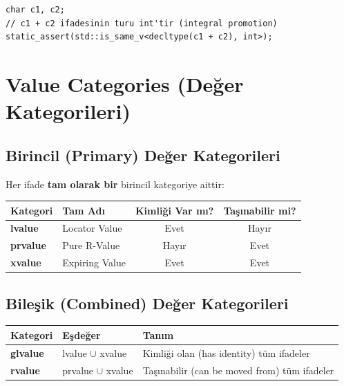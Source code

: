 \documentclass[a4paper,12pt]{article}
\begin{document}
\begin{lstlisting}
char c1, c2;
// c1 + c2 ifadesinin turu int'tir (integral promotion)
static_assert(std::is_same_v<decltype(c1 + c2), int>);
\end{lstlisting}

\section{Value Categories (Değer Kategorileri)}

\subsection{Birincil (Primary) Değer Kategorileri}

Her ifade \textbf{tam olarak bir} birincil kategoriye aittir:

\begin{table}[h]
\centering
\begin{tabular}{@{}llcc@{}}
\toprule
\textbf{Kategori} & \textbf{Tam Adı} & \textbf{Kimliği Var mı?} & \textbf{Taşınabilir mi?} \\
\midrule
\textbf{lvalue}  & Locator Value  & Evet  & Hayır \\
\textbf{prvalue} & Pure R-Value   & Hayır & Evet  \\
\textbf{xvalue}  & Expiring Value & Evet  & Evet  \\
\bottomrule
\end{tabular}
\end{table}

\subsection{Bileşik (Combined) Değer Kategorileri}

\begin{table}[h]
\centering
\begin{tabular}{@{}lll@{}}
\toprule
\textbf{Kategori} & \textbf{Eşdeğer} & \textbf{Tanım} \\
\midrule
\textbf{glvalue} & lvalue $\cup$ xvalue & Kimliği olan (has identity) tüm ifadeler \\
\textbf{rvalue}  & prvalue $\cup$ xvalue & Taşınabilir (can be moved from) tüm ifadeler \\
\bottomrule
\end{tabular}
\end{table}
\end{document}
